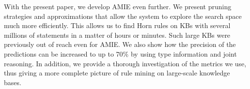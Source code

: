 With the present paper, we develop AMIE even further.
We present pruning strategies and approximations that allow the system to explore the search space much more efficiently.
This allows us to find Horn rules on KBs with several millions of statements in a matter of hours or minutes.
Such large KBs were previously out of reach even for AMIE. %
We also show how the precision of the predictions can be increased to up to 70\% by using type information and joint reasoning.
In addition, we provide a thorough investigation of the metrics we use,
thus giving a more complete picture of rule mining on large-scale knowledge bases.


